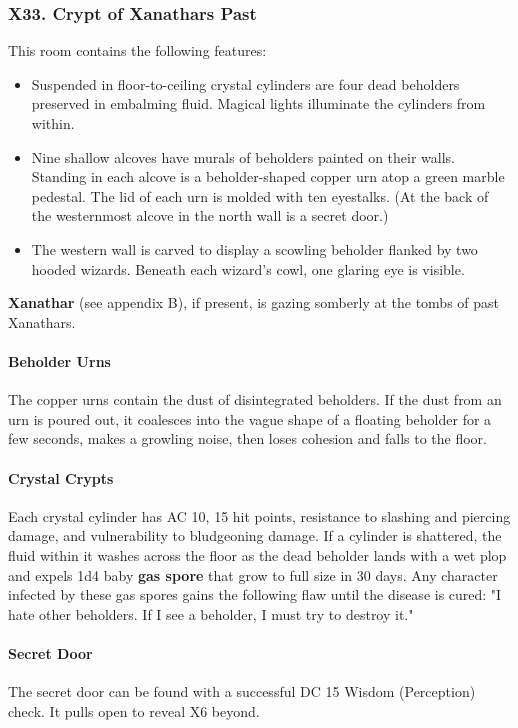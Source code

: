 \documentclass[10pt,a4paper,twoside,twocolumn,openany,nodeprecatedcode]{dndbook}
\begin{document}
\subsubsection{X33. Crypt of Xanathars Past}
This room contains the following features:
\begin{itemize}

\item Suspended in floor-to-ceiling crystal cylinders are four dead beholders preserved in embalming fluid. Magical lights illuminate the cylinders from within.
\item Nine shallow alcoves have murals of beholders painted on their walls. Standing in each alcove is a beholder-shaped copper urn atop a green marble pedestal. The lid of each urn is molded with ten eyestalks. (At the back of the westernmost alcove in the north wall is a secret door.)
\item The western wall is carved to display a scowling beholder flanked by two hooded wizards. Beneath each wizard's cowl, one glaring eye is visible.
\end{itemize}


\textbf{Xanathar} (see appendix B), if present, is gazing somberly at the tombs of past Xanathars.
\paragraph{Beholder Urns}
The copper urns contain the dust of disintegrated beholders. If the dust from an urn is poured out, it coalesces into the vague shape of a floating beholder for a few seconds, makes a growling noise, then loses cohesion and falls to the floor.
\paragraph{Crystal Crypts}
Each crystal cylinder has AC 10, 15 hit points, resistance to slashing and piercing damage, and vulnerability to bludgeoning damage. If a cylinder is shattered, the fluid within it washes across the floor as the dead beholder lands with a wet plop and expels 1d4 baby \textbf{gas spore} that grow to full size in 30 days. Any character infected by these gas spores gains the following flaw until the disease is cured: "I hate other beholders. If I see a beholder, I must try to destroy it."
\paragraph{Secret Door}
The secret door can be found with a successful DC 15 Wisdom (Perception) check. It pulls open to reveal X6 beyond.
\end{document}
